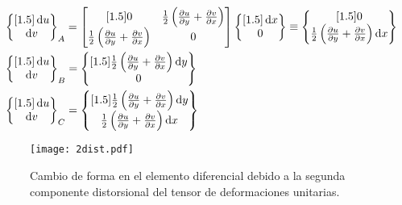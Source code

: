 \documentclass[../notas medios.tex]{subfiles}
\begin{document}
\begin{align*}
&\begin{Bmatrix}[1.5]
\dd{u}\\
\dd{v}
\end{Bmatrix}_A = \begin{bmatrix}[1.5]
0 &\frac{1}{2}\left(\pdv{u}{y} + \pdv{v}{x}\right)\\
\frac{1}{2}\left(\pdv{u}{y} + \pdv{v}{x}\right) &0
\end{bmatrix} \begin{Bmatrix}[1.5]
\dd{x}\\
0
\end{Bmatrix} \equiv \begin{Bmatrix}[1.5]
0\\
\frac{1}{2}\left(\pdv{u}{y} + \pdv{v}{x}\right) \dd{x}
\end{Bmatrix}\\
&\begin{Bmatrix}[1.5]
\dd{u}\\
\dd{v}
\end{Bmatrix}_B = \begin{Bmatrix}[1.5]
\frac{1}{2}\left(\pdv{u}{y} + \pdv{v}{x}\right) \dd{y}\\
0
\end{Bmatrix}\\
&\begin{Bmatrix}[1.5]
\dd{u}\\
\dd{v}
\end{Bmatrix}_C = \begin{Bmatrix}[1.5]
\frac{1}{2}\left(\pdv{u}{y} + \pdv{v}{x}\right) \dd{y}\\
\frac{1}{2}\left(\pdv{u}{y} + \pdv{v}{x}\right) \dd{x}
\end{Bmatrix}
\end{align*}

\begin{figure}[H]
\centering
	\texttt{[image: 2dist.pdf]}
	\caption{Cambio de forma en el elemento diferencial debido a la segunda componente distorsional del tensor de deformaciones unitarias.}
	\label{2dist}
\end{figure}
\end{document}
